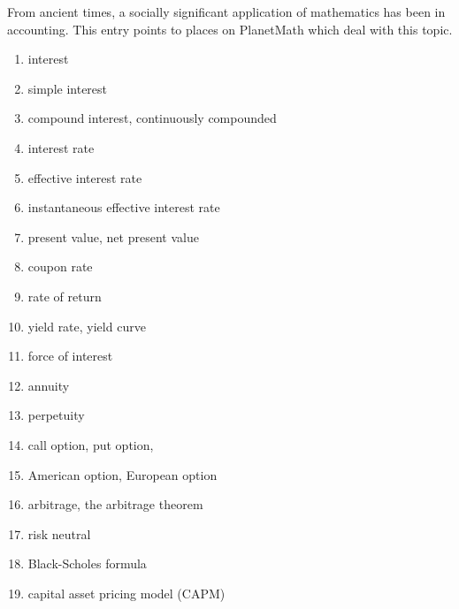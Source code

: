\documentclass[12pt]{article}
\begin{document}
From ancient times, a socially significant application of mathematics 
has been in accounting.  This entry points to places on
PlanetMath which deal with this topic.

\begin{enumerate}
\item interest
\item simple interest
\item compound interest, continuously compounded
\item interest rate
\item effective interest rate
\item instantaneous effective interest rate
\item present value, net present value
\item coupon rate
\item rate of return
\item yield rate, yield curve
\item force of interest
\item annuity
\item perpetuity
\item call option, put option, 
\item American option, European option
\item arbitrage, the arbitrage theorem
\item risk neutral
\item Black-Scholes formula
\item capital asset pricing model (CAPM)
\end{enumerate}

\end{document}
